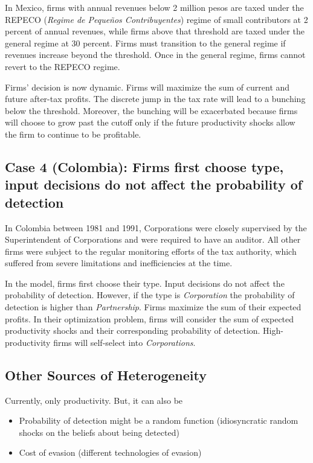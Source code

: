 \documentclass[
  12pt]{article}
\providecommand{\tightlist}{%
  \setlength{\itemsep}{0pt}\setlength{\parskip}{0pt}}\usepackage{longtable,booktabs,array}
\theoremstyle{definition}
\theoremstyle{remark}
\begin{document}
In Mexico, firms with annual revenues below 2 million pesos are taxed
under the REPECO (\emph{Regime de Pequeños Contribuyentes}) regime of
small contributors at 2 percent of annual revenues, while firms above
that threshold are taxed under the general regime at 30 percent. Firms
must transition to the general regime if revenues increase beyond the
threshold. Once in the general regime, firms cannot revert to the REPECO
regime.

Firms' decision is now dynamic. Firms will maximize the sum of current
and future after-tax profits. The discrete jump in the tax rate will
lead to a bunching below the threshold. Moreover, the bunching will be
exacerbated because firms will choose to grow past the cutoff only if
the future productivity shocks allow the firm to continue to be
profitable.

\subsection{Case 4 (Colombia): Firms first choose type, input decisions
do not affect the probability of
detection}\label{case-4-colombia-firms-first-choose-type-input-decisions-do-not-affect-the-probability-of-detection}

In Colombia between 1981 and 1991, Corporations were closely supervised
by the Superintendent of Corporations and were required to have an
auditor. All other firms were subject to the regular monitoring efforts
of the tax authority, which suffered from severe limitations and
inefficiencies at the time.

In the model, firms first choose their type. Input decisions do not
affect the probability of detection. However, if the type is
\emph{Corporation} the probability of detection is higher than
\emph{Partnership}. Firms maximize the sum of their expected profits. In
their optimization problem, firms will consider the sum of expected
productivity shocks and their corresponding probability of detection.
High-productivity firms will self-select into \emph{Corporations}.

\subsection{Other Sources of
Heterogeneity}\label{other-sources-of-heterogeneity}

Currently, only productivity. But, it can also be

\begin{itemize}
\tightlist
\item
  Probability of detection might be a random function (idiosyncratic
  random shocks on the beliefs about being detected)
\item
  Cost of evasion (different technologies of evasion)
\end{itemize}
\end{document}
